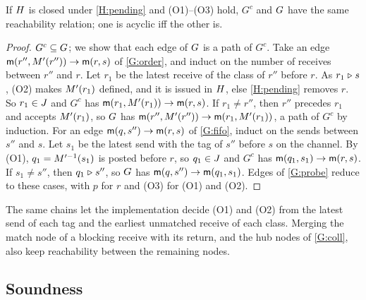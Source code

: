 \begin{lemma}\label{lem:app-chain}
If $H$ is closed under \ref{H:pending} and (O1)--(O3) hold, $G^{c}$ and $G$ have the
same reachability relation; one is acyclic iff the other is.
\end{lemma}

\begin{proof}
$G^{c}\subseteq G$; we show that each edge of $G$ is a path of $G^{c}$. Take an edge
$\mathsf{m}(r'',M'(r''))\to\mathsf{m}(r,s)$ of \ref{G:order}, and induct on the number of receives
between $r''$ and $r$. Let $r_1$ be the latest receive of the class of $r''$ before $r$. As
$r_1\mathrel{\triangleright} s$, (O2) makes $M'(r_1)$ defined, and it is issued in $H$, else
\ref{H:pending} removes $r$. So $r_1\in J$ and $G^{c}$ has
$\mathsf{m}(r_1,M'(r_1))\to\mathsf{m}(r,s)$. If $r_1\ne r''$, then $r''$ precedes $r_1$ and accepts
$M'(r_1)$, so $G$ has $\mathsf{m}(r'',M'(r''))\to\mathsf{m}(r_1,M'(r_1))$, a path of
$G^{c}$ by induction. For an edge $\mathsf{m}(q,s'')\to\mathsf{m}(r,s)$ of \ref{G:fifo}, induct on the
sends between $s''$ and $s$. Let $s_1$ be the latest send with the tag of $s''$ before $s$ on the
channel. By (O1), $q_1=M'^{-1}(s_1)$ is posted before $r$, so $q_1\in J$ and $G^{c}$ has
$\mathsf{m}(q_1,s_1)\to\mathsf{m}(r,s)$. If $s_1\ne s''$, then $q_1\mathrel{\triangleright} s''$, so $G$ has
$\mathsf{m}(q,s'')\to\mathsf{m}(q_1,s_1)$. Edges of \ref{G:probe} reduce to these cases, with $p$ for
$r$ and (O3) for (O1) and (O2).
\end{proof}

The same chains let the implementation decide (O1) and (O2) from the latest send of each tag and
the earliest unmatched receive of each class. Merging the match node of a blocking receive with
its return, and the hub nodes of \ref{G:coll}, also keep reachability between the remaining
nodes.

\subsection{Soundness}
\label{app:sound}

